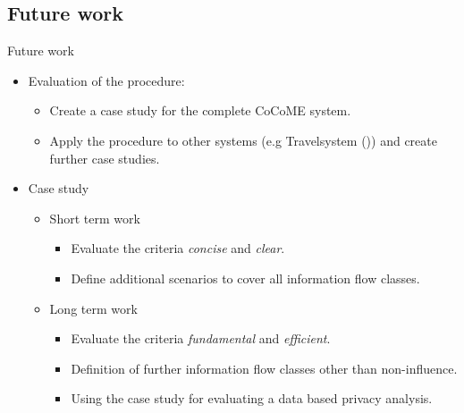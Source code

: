 \documentclass[18pt]{beamer}
\begin{document}
\subsection{Future work}
\begin{frame}{Future work}
\begin{itemize}
\item Evaluation of the procedure:
\begin{itemize}
\item Create a case study for the complete CoCoME system.
\item Apply the procedure to other systems (e.g Travelsystem (\cite{Travelsystem})) and create further case studies.
\end{itemize}
\item Case study
\begin{itemize}
\item Short term work
\begin{itemize}
\item Evaluate the criteria \textit{concise} and \textit{clear}. 
\item Define additional scenarios to cover all information flow classes.
\end{itemize}

\item Long term work
\begin{itemize}
\item Evaluate the criteria \textit{fundamental} and \textit{efficient}.
\item Definition of further information flow classes other than non-influence. 
\item Using the case study for evaluating a data based privacy analysis.
\end{itemize}
\end{itemize}

\end{itemize}
\end{frame}
\end{document}
